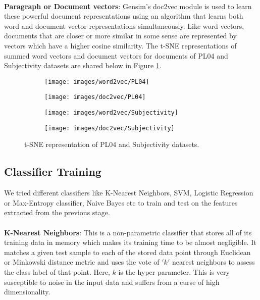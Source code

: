 \documentclass[a4paper,26pt]{article}
\begin{document}
\paragraph{}
\textbf{Paragraph or Document vectors}: Gensim's doc2vec module is used to learn these powerful document representations using an algorithm that learns both word and document vector representations simultaneously. Like word vectors, documents that are closer or more similar in some sense are represented by vectors which have a higher cosine similarity. The t-SNE representations of summed word vectors and document vectors for documents of PL04 and Subjectivity datasets are shared below in Figure \ref{fig:tsne}.

\begin{figure}[H]
    \centering
    \begin{subfigure}[b]{0.4\textwidth}
        \centering
        \texttt{[image: images/word2vec/PL04]}
        \caption{}
    \end{subfigure}
    \begin{subfigure}[b]{0.4\textwidth}
        \centering
        \texttt{[image: images/doc2vec/PL04]}
        \caption{}
    \end{subfigure}
    \hfill
    \begin{subfigure}[b]{0.4\textwidth}
        \centering
        \texttt{[image: images/word2vec/Subjectivity]}
        \caption{}
    \end{subfigure}
    \begin{subfigure}[b]{0.4\textwidth}
        \centering
        \texttt{[image: images/doc2vec/Subjectivity]}
        \caption{}
    \end{subfigure}
    \caption{t-SNE representation of PL04 and Subjectivity datasets.}
    \label{fig:tsne}
\end{figure}

\subsection{Classifier Training}

We tried different classifiers like K-Nearest Neighbors, SVM, Logistic Regression or Max-Entropy classifier, Naive Bayes etc to train and test on the features extracted from the previous stage.

\paragraph{}
\textbf{K-Nearest Neighbors}: This is a non-parametric classifier that stores all of its training data in memory which makes its training time to be almost negligible. It matches a given test sample to each of the stored data point through Euclidean or Minkowski distance metric and uses the vote of $'k'$ nearest neighbors to assess the class label of that point. Here, $k$ is the hyper parameter. This is very susceptible to noise in the input data and suffers from a curse of high dimensionality.
\end{document}
